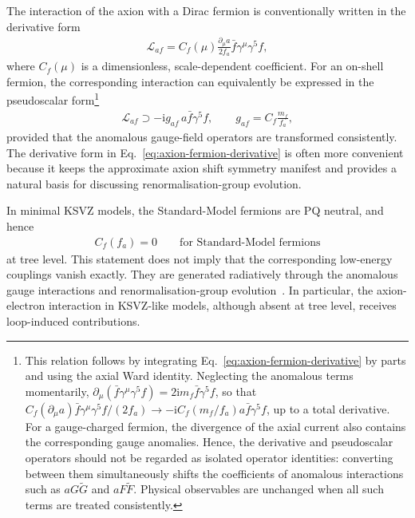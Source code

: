 \documentclass[review]{elsarticle}
\numberwithin{equation}{section}
\numberwithin{table}{section}
\numberwithin{figure}{section}
\def\i{\mathrm{i}}
\begin{document}
The interaction of the axion with a Dirac fermion is conventionally written in the derivative form
\begin{align}
    \mathcal{L}_{af}
    = C_f(\mu) \frac{\partial_\mu a}{2f_a} \bar f\gamma^\mu\gamma^5f ,
    \label{eq:axion-fermion-derivative}
\end{align}
where $C_f(\mu)$ is a dimensionless, scale-dependent coefficient. For an on-shell fermion, the corresponding interaction can equivalently be expressed in the pseudoscalar form\footnote{This relation follows by integrating Eq.~\eqref{eq:axion-fermion-derivative} by parts and using the axial Ward identity. Neglecting the anomalous terms momentarily, $\partial_\mu(\bar f\gamma^\mu\gamma^5f)=2\i m_f\bar f\gamma^5f$, so that
$C_f(\partial_\mu a)\bar f\gamma^\mu\gamma^5f/(2f_a)\rightarrow-\i C_f(m_f/f_a)a\bar f\gamma^5f$, up to a total derivative. For a gauge-charged fermion, the divergence of the axial current also contains the corresponding gauge anomalies. Hence, the derivative and pseudoscalar operators should not be regarded as isolated operator identities: converting between them simultaneously shifts the coefficients of anomalous interactions such as $aG\widetilde G$ and $aF\widetilde F$. Physical observables are unchanged when all such terms are treated consistently.}
\begin{align}
    \mathcal{L}_{af}
    \supset
    -\i g_{af}\,
    a\bar f\gamma^5f,
    \qquad
    g_{af}
    =
    C_f\frac{m_f}{f_a},
    \label{eq:axion-fermion-pseudoscalar}
\end{align}
provided that the anomalous gauge-field operators are transformed consistently.
The derivative form in Eq.~\eqref{eq:axion-fermion-derivative} is often more convenient because it keeps the approximate axion shift symmetry manifest and provides a natural basis for discussing renormalisation-group evolution.

In minimal KSVZ models, the Standard-Model fermions are PQ neutral, and hence
\begin{align}
    C_f(f_a)=0
    \qquad
    \text{for Standard-Model fermions}
    \label{eq:KSVZ-Cf-tree}
\end{align}
at tree level. This statement does not imply that the corresponding low-energy couplings vanish exactly. They are generated radiatively through the anomalous gauge interactions and renormalisation-group evolution~\cite{Srednicki:1985xd,Choi:2021kuy}. In particular, the axion-electron interaction in KSVZ-like models, although absent at tree level, receives loop-induced contributions.
\end{document}
